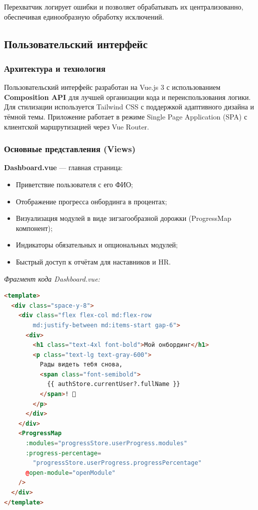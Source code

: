 Перехватчик логирует ошибки и позволяет обрабатывать их централизованно, обеспечивая единообразную обработку исключений.


\subsection{Пользовательский интерфейс}

\subsubsection{Архитектура и технология}

Пользовательский интерфейс разработан на Vue.js 3 с использованием \textbf{Composition API} для лучшей организации кода и переиспользования логики. Для стилизации используется Tailwind CSS с поддержкой адаптивного дизайна и тёмной темы. Приложение работает в режиме Single Page Application (SPA) с клиентской маршрутизацией через Vue Router.

\subsubsection{Основные представления (Views)}

\textbf{Dashboard.vue} --- главная страница:
\begin{itemize}
    \item Приветствие пользователя с его ФИО;
    \item Отображение прогресса онбординга в процентах;
    \item Визуализация модулей в виде зигзагообразной дорожки (ProgressMap компонент);
    \item Индикаторы обязательных и опциональных модулей;
    \item Быстрый доступ к отчётам для наставников и HR.
\end{itemize}

\textit{Фрагмент кода Dashboard.vue:}
\begin{lstlisting}[language=HTML, basicstyle=\ttfamily\small]
<template>
  <div class="space-y-8">
    <div class="flex flex-col md:flex-row 
        md:justify-between md:items-start gap-6">
      <div>
        <h1 class="text-4xl font-bold">Мой онбординг</h1>
        <p class="text-lg text-gray-600">
          Рады видеть тебя снова, 
          <span class="font-semibold">
            {{ authStore.currentUser?.fullName }}
          </span>! 👋
        </p>
      </div>
    </div>
    <ProgressMap
      :modules="progressStore.userProgress.modules"
      :progress-percentage=
        "progressStore.userProgress.progressPercentage"
      @open-module="openModule"
    />
  </div>
</template>
\end{lstlisting}

